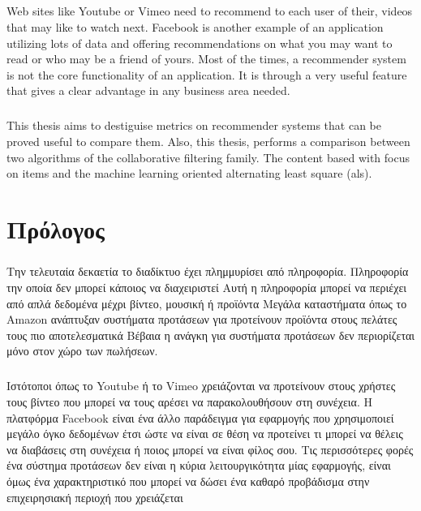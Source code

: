 \documentclass[12pt, a4paper, oneside, greek]{report}
\begin{document}
	\paragraph{}Web sites like Youtube or Vimeo need to recommend to each user of their, videos that may like to watch next. Facebook is another example of an application utilizing lots of data and offering recommendations on what you may want to read or who may be a friend of yours. Most of the times, a recommender system is not the core functionality of an application. It is through a very useful feature that gives a clear advantage in any business area needed.
	
	\paragraph{} This thesis aims to destiguise metrics on recommender systems  that can be proved useful to compare them. Also, this thesis, performs a comparison between two algorithms of the collaborative filtering family. The content based with focus on items and the machine learning oriented alternating least square (als).
	\newpage
	\chapter*{Πρόλογος}
	\paragraph{} Την τελευταία δεκαετία το διαδίκτυο έχει πλημμυρίσει από πληροφορία. Πληροφορία την οποία δεν μπορεί κάποιος να διαχειριστεί Αυτή η πληροφορία μπορεί να περιέχει από απλά δεδομένα μέχρι βίντεο, μουσική ή προϊόντα Μεγάλα καταστήματα όπως το Amazon ανάπτυξαν συστήματα προτάσεων για προτείνουν προϊόντα στους πελάτες τους πιο αποτελεσματικά Βέβαια η ανάγκη για συστήματα προτάσεων δεν περιορίζεται μόνο στον χώρο των πωλήσεων.
	
	\paragraph{} Ιστότοποι όπως το Youtube ή το Vimeo χρειάζονται να προτείνουν στους χρήστες τους βίντεο που μπορεί να τους αρέσει να παρακολουθήσουν στη συνέχεια. Η πλατφόρμα Facebook είναι ένα άλλο παράδειγμα για εφαρμογής που χρησιμοποιεί μεγάλο όγκο δεδομένων έτσι ώστε να είναι σε θέση να προτείνει τι μπορεί να θέλεις να διαβάσεις στη συνέχεια ή ποιος μπορεί να είναι φίλος σου. Τις περισσότερες φορές ένα σύστημα προτάσεων δεν είναι η κύρια λειτουργικότητα μίας εφαρμογής, είναι όμως ένα χαρακτηριστικό που μπορεί να δώσει ένα καθαρό προβάδισμα στην επιχειρησιακή περιοχή που χρειάζεται
	
\end{document}
